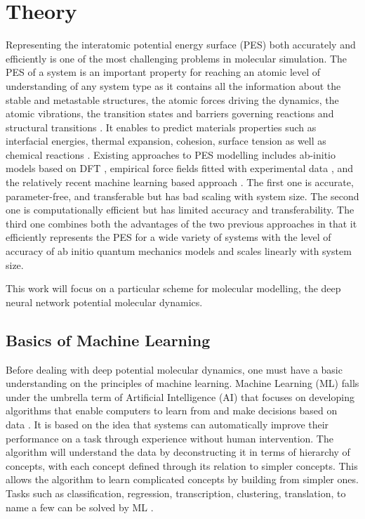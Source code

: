 \chapter{Theory}

Representing the interatomic potential energy surface (PES) both accurately and efficiently is one of the most challenging problems in molecular simulation. The  PES of a system is an important property for reaching an atomic level of understanding of any system type as it contains all the information about the stable and metastable structures, the atomic forces driving the dynamics, the atomic vibrations, the transition states and barriers governing reactions and structural transitions \cite{kocer2022neural}. It enables to  predict materials properties such as interfacial energies, thermal expansion, cohesion, surface tension as well as chemical
reactions \cite{tersoff1988new,sinnott2012three}. Existing approaches to PES modelling includes ab-initio models based on DFT \cite{car1985unified,Marx2009,kohn1965self},
empirical force fields fitted with experimental data \cite{Duin2001,brenner2002second,daw1984embedded}, and the
relatively recent
machine learning based approach \cite{Thompson2015,Huan2017,Behler2007,Behler2016,Chmiela2017}. The first one is accurate, parameter-free, and
transferable but has bad scaling with system size. The second one is
computationally efficient but has limited accuracy and transferability.
The third one combines both the advantages of the two previous approaches in
that it efficiently represents the PES for a
wide variety of systems with the level of accuracy of ab initio quantum
mechanics
models and scales linearly with system size.

This work will focus on a particular scheme for molecular modelling, the deep
neural network
potential molecular dynamics.

\section{Basics of Machine Learning}
Before dealing with deep potential molecular dynamics, one must have a basic
understanding on the principles of machine learning. Machine Learning (ML)
falls
under
the umbrella
term of Artificial Intelligence
(AI)
that focuses on developing algorithms that enable computers to learn from and
make decisions based on data \cite{James2021,Hastie2009}. It is based on the idea that systems can
automatically improve their performance on a task through experience without
human intervention. The algorithm will understand the data by deconstructing it
in terms of hierarchy of concepts, with each concept defined through its
relation to simpler concepts. This allows the algorithm to learn complicated
concepts by building from simpler ones. Tasks such as classification,
regression, transcription, clustering, translation, to name a few can be solved
by ML \cite{Goodfellow2016}.


